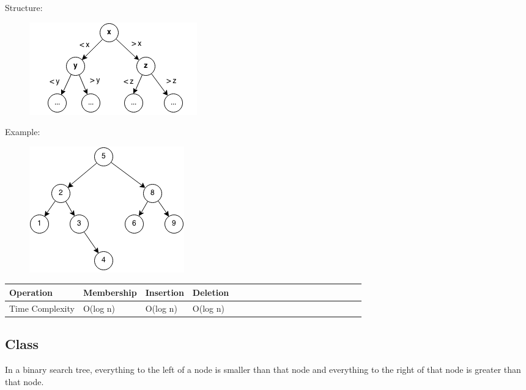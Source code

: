 \documentclass[11pt,oneside]{book}
\makeatletter
\def\maxwidth#1{\ifdim\Gin@nat@width>#1 #1\else\Gin@nat@width\fi}
\makeatother
\begin{document}
Structure:

\vspace{5px}\begin{figure}[H]\centering
        \includegraphics[width=0.66\maxwidth{\textwidth}]{bstcompare.png}
        \end{figure}

Example:

\vspace{5px}\begin{figure}[H]\centering
        \includegraphics[width=0.66\maxwidth{\textwidth}]{bst.png}
        \end{figure}

\begin{center}\begin{tabulary}{0.4\linewidth}{|l|l|l|l|l|l|l|l|l|l|l|l|l|l|l|l|l|l|l}\hline


  Operation &
  Membership &
  Insertion &
  Deletion\\
\hline


  Time Complexity &
  O(log n) &
  O(log n) &
  O(log n)\\

\hline\end{tabulary}\end{center}

\subsection{Class}

In a binary search tree, everything to the left of a node is smaller than that node and everything to the right of that node is greater than that node.
\end{document}
